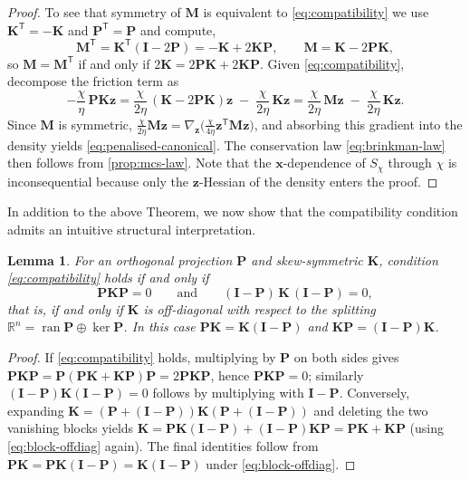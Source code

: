 \documentclass[11pt]{article}
\newtheorem{lemma}[theorem]{Lemma}
\theoremstyle{definition}
\theoremstyle{remark}
\newcommand{\R}{\mathbb{R}}
\newcommand{\bz}{\bm{z}}
\newcommand{\bx}{\bm{x}}
\newcommand{\bK}{\bm{K}}
\newcommand{\bP}{\bm{P}}
\newcommand{\bM}{\bm{M}}
\newcommand{\bI}{\bm{I}}
\DeclareMathOperator{\ran}{ran}
\begin{document}
\begin{proof}
To see that symmetry of $\bM$ is equivalent to \eqref{eq:compatibility} we use $\bK^{\mathsf T}=-\bK$ and $\bP^{\mathsf T}=\bP$ and compute,
\[
\bM^{\mathsf T} = \bK^{\mathsf T}(\bI-2\bP) = -\bK+2\bK\bP,
\qquad
\bM = \bK - 2\bP\bK ,
\]
so $\bM=\bM^{\mathsf T}$ if and only if $2\bK = 2\bP\bK+2\bK\bP$.
Given \eqref{eq:compatibility}, decompose the friction term as
\[
-\frac{\chi}{\eta}\,\bP\bK\bz
= \frac{\chi}{2\eta}\,(\bK-2\bP\bK)\bz
  \;-\;\frac{\chi}{2\eta}\,\bK\bz
= \frac{\chi}{2\eta}\,\bM\bz \;-\;\frac{\chi}{2\eta}\,\bK\bz .
\]
Since $\bM$ is symmetric,
$\frac{\chi}{2\eta}\bM\bz
= \nabla_{\bz}\bigl(\frac{\chi}{4\eta}\bz^{\mathsf T}\bM\bz\bigr)$,
and absorbing this gradient into the density yields
\eqref{eq:penalised-canonical}.  The conservation law
\eqref{eq:brinkman-law} then follows from \cref{prop:mcs-law}. Note
that the $\bx$-dependence of $S_\chi$ through $\chi$ is inconsequential
because only the $\bz$-Hessian of the density enters the proof.
\end{proof}

In addition to the above Theorem, we now show that the compatibility condition admits an intuitive structural interpretation.

\begin{lemma}
\label{lem:interpretation}
For an orthogonal projection $\bP$ and skew-symmetric $\bK$, condition
\eqref{eq:compatibility} holds if and only if
\begin{equation}
\label{eq:block-offdiag}
\bP\bK\bP = 0
\qquad\text{and}\qquad
(\bI-\bP)\,\bK\,(\bI-\bP) = 0 ,
\end{equation}
that is, if and only if $\bK$ is off-diagonal with respect to the
splitting $\R^n=\ran\bP\oplus\ker\bP$.  In this case
$\bP\bK=\bK(\bI-\bP)$ and $\bK\bP=(\bI-\bP)\bK$.
\end{lemma}

\begin{proof}
If \eqref{eq:compatibility} holds, multiplying by $\bP$ on both sides
gives $\bP\bK\bP = \bP(\bP\bK+\bK\bP)\bP = 2\bP\bK\bP$, hence
$\bP\bK\bP=0$; similarly $(\bI-\bP)\bK(\bI-\bP)=0$ follows by
multiplying with $\bI-\bP$.  Conversely, expanding
$\bK=(\bP+(\bI-\bP))\bK(\bP+(\bI-\bP))$ and deleting the two vanishing
blocks yields $\bK=\bP\bK(\bI-\bP)+(\bI-\bP)\bK\bP=\bP\bK+\bK\bP$
(using \eqref{eq:block-offdiag} again).  The final identities follow
from $\bP\bK=\bP\bK(\bI-\bP)=\bK(\bI-\bP)$ under
\eqref{eq:block-offdiag}.
\end{proof}
\end{document}
